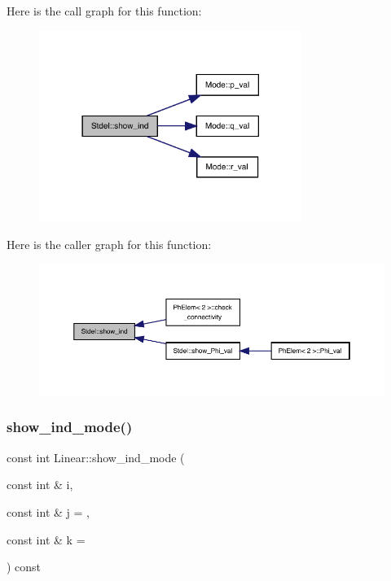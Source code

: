 Here is the call graph for this function\+:
\nopagebreak
\begin{figure}[H]
\begin{center}
\leavevmode
\includegraphics[width=242pt]{classStdel_a20afd536025caf1aad1c4e3f41fcb866_cgraph}
\end{center}
\end{figure}
Here is the caller graph for this function\+:
\nopagebreak
\begin{figure}[H]
\begin{center}
\leavevmode
\includegraphics[width=350pt]{classStdel_a20afd536025caf1aad1c4e3f41fcb866_icgraph}
\end{center}
\end{figure}
\mbox{\label{classLinear_a6de1b726827024c428333e79df48e866}} 
\subsubsection{\texorpdfstring{show\+\_\+ind\+\_\+mode()}{show\_ind\_mode()}}
{\footnotesize\ttfamily const int Linear\+::show\+\_\+ind\+\_\+mode (\begin{DoxyParamCaption}\item[{const int \&}]{i,  }\item[{const int \&}]{j = {},  }\item[{const int \&}]{k = {} }\end{DoxyParamCaption}) const\hspace{0.3cm}{\ttfamily [virtual]}}



